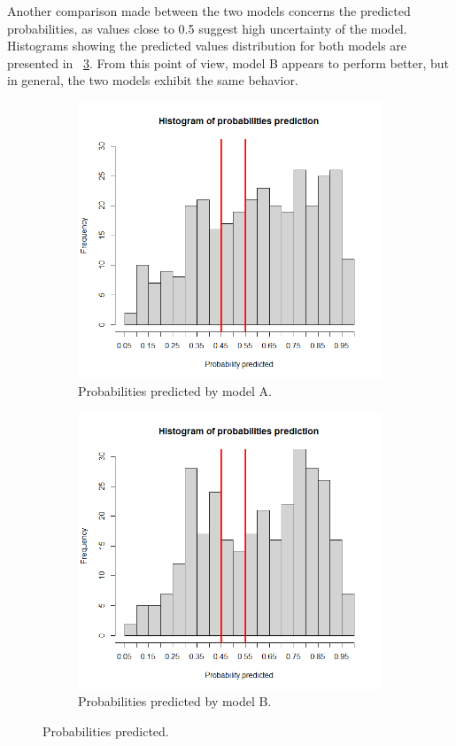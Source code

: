Another comparison made between the two models concerns the predicted probabilities, as values close to 0.5 suggest high uncertainty of the model. Histograms showing the predicted values distribution for both models are presented in \Fig~\ref{fig:ProbPred}. From this point of view, model B appears to perform better, but in general, the two models exhibit the same behavior.

\begin{figure}[h]
	\begin{subfigure}{.6\textwidth}
		\centering
		\includegraphics[width=0.7\linewidth]{ImageFiles/Classification/LogReg/probability_pred_all}
		\caption{Probabilities predicted by model A.}
		\label{fig:ProbPredA}
	\end{subfigure}
	\begin{subfigure}{.6\textwidth}
		\centering
		\includegraphics[width=0.7\linewidth]{ImageFiles/Classification/LogReg/probability_pred_imp}
		\caption{Probabilities predicted by model B.}
		\label{fig:ProbPredB}
	\end{subfigure}
	\caption{Probabilities predicted.}
	\label{fig:ProbPred}
\end{figure}

